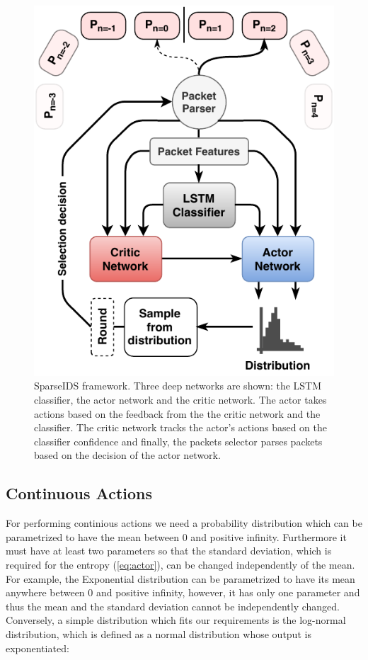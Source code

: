 \documentclass[conference]{IEEEtran}
\newcommand\note[2]{{\color{#1}#2}}
\begin{document}
\begin{figure}
\centering
  \includegraphics[width=0.8\columnwidth]{img/rnn-sampling.pdf}
  \caption{SparseIDS framework. Three deep networks are shown: the LSTM classifier, the actor network and the critic network. The actor takes actions based on the feedback from the the critic network and the classifier. The critic network tracks the actor's actions based on the classifier confidence and finally, the packets selector parses packets based on the decision of the actor network.}
  \label{fig:sampling}
\end{figure}


\subsection{Continuous Actions}

For performing continious actions we need a probability distribution which can be parametrized to have the mean between 0 and positive infinity. Furthermore it must have at least two parameters so that the standard deviation, which is required for the entropy (\autoref{eq:actor}), can be changed independently of the mean. For example, the Exponential distribution can be parametrized to have its mean anywhere between 0 and positive infinity, however, it has only one parameter and thus the mean and the standard deviation cannot be independently changed. Conversely, a simple distribution which fits our requirements is the log-normal distribution, which is defined as a normal distribution whose output is exponentiated:
\end{document}
